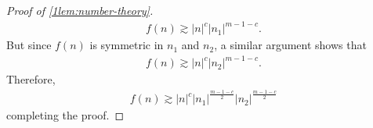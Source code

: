 \begin{proof}[Proof of \cref{1lem:number-theory}]
%
\begin{equation*}
	\begin{split}
		f(n) \gtrsim |n|^{c} | n_1 |^{m-1-c}. 
	\end{split}
\end{equation*}
%
%
But since $f(n)$ is symmetric in $n_1$ and $n_2$, a similar argument shows that
%
%
\begin{equation*}
	\begin{split}
		f(n) \gtrsim |n|^{c} | n_2 |^{m-1-c}. 
	\end{split}
\end{equation*}
%
%
Therefore,
%
%
\begin{equation*}
	\begin{split}
		f(n) \gtrsim | n |^{c}| n_1 |^{\frac{m-1-c}{2}} | n_2 |^{\frac{m-1-c}{2}}
	\end{split}
\end{equation*}
%
%
completing the proof. 
\end{proof}
%
%
